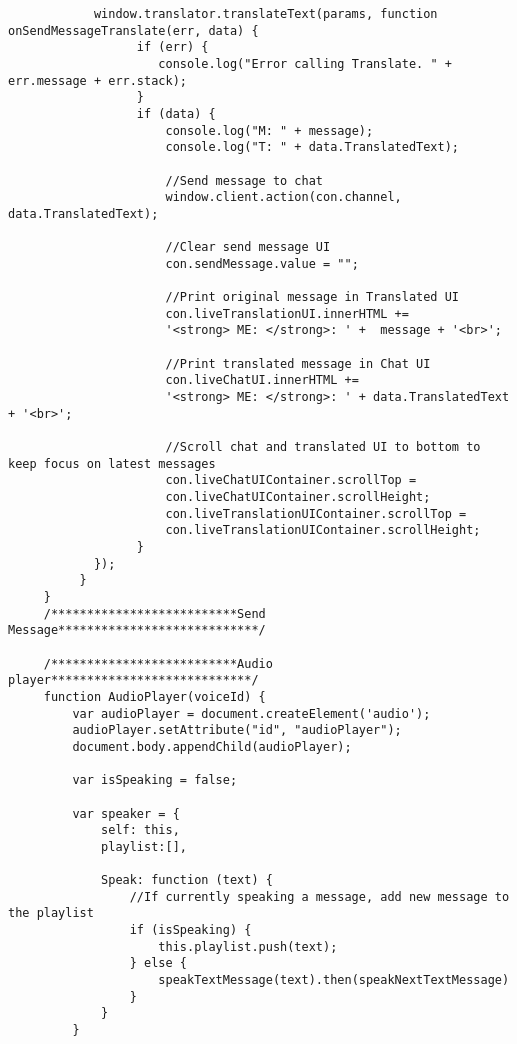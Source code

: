 \documentclass[runningheads]{llncs}
\begin{document}
{\begin{verbatim}
            window.translator.translateText(params, function onSendMessageTranslate(err, data) {
                  if (err) {
                     console.log("Error calling Translate. " + err.message + err.stack);
                  }
                  if (data) {
                      console.log("M: " + message);
                      console.log("T: " + data.TranslatedText);

                      //Send message to chat
                      window.client.action(con.channel, data.TranslatedText);

                      //Clear send message UI
                      con.sendMessage.value = "";

                      //Print original message in Translated UI
                      con.liveTranslationUI.innerHTML +=
                      '<strong> ME: </strong>: ' +  message + '<br>';

                      //Print translated message in Chat UI
                      con.liveChatUI.innerHTML += 
                      '<strong> ME: </strong>: ' + data.TranslatedText + '<br>';

                      //Scroll chat and translated UI to bottom to keep focus on latest messages
                      con.liveChatUIContainer.scrollTop = 
                      con.liveChatUIContainer.scrollHeight;
                      con.liveTranslationUIContainer.scrollTop = 
                      con.liveTranslationUIContainer.scrollHeight;
                  }
            });
          }
     }
     /**************************Send Message****************************/

     /**************************Audio player****************************/
     function AudioPlayer(voiceId) {
         var audioPlayer = document.createElement('audio');
         audioPlayer.setAttribute("id", "audioPlayer");
         document.body.appendChild(audioPlayer);

         var isSpeaking = false;

         var speaker = {
             self: this,
             playlist:[],

             Speak: function (text) {
                 //If currently speaking a message, add new message to the playlist
                 if (isSpeaking) {
                     this.playlist.push(text);
                 } else {
                     speakTextMessage(text).then(speakNextTextMessage)
                 }
             }
         }


\end{verbatim}}
\end{document}
